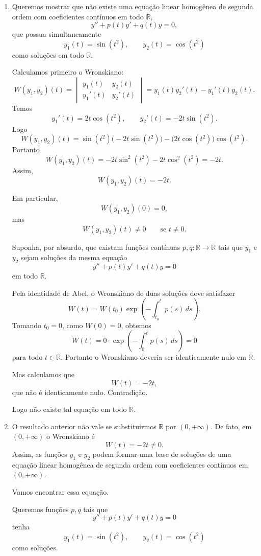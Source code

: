 \documentclass[a4paper,11pt,reqno]{amsart}
\begin{document}
\begin{enumerate}
\begin{enumerate}

\item Queremos mostrar que não existe uma equação linear homogênea de segunda ordem com coeficientes contínuos em todo $\mathbb{R}$,
\[
    y''+p(t)y'+q(t)y=0,
\]
que possua simultaneamente
\[
    y_1(t)=\sin(t^2),
    \qquad
    y_2(t)=\cos(t^2)
\]
como soluções em todo $\mathbb{R}$.

Calculamos primeiro o Wronskiano:
\[
    W(y_1,y_2)(t)
    =
    \begin{vmatrix}
        y_1(t) & y_2(t)\\
        y_1'(t) & y_2'(t)
    \end{vmatrix}
    =
    y_1(t)y_2'(t)-y_1'(t)y_2(t).
\]
Temos
\[
    y_1'(t)=2t\cos(t^2),
    \qquad
    y_2'(t)=-2t\sin(t^2).
\]
Logo
\[
    W(y_1,y_2)(t)
    =
    \sin(t^2)\bigl(-2t\sin(t^2)\bigr)
    -
    \bigl(2t\cos(t^2)\bigr)\cos(t^2).
\]
Portanto
\[
    W(y_1,y_2)(t)
    =
    -2t\sin^2(t^2)-2t\cos^2(t^2)
    =
    -2t.
\]
Assim,
\[
    \boxed{W(y_1,y_2)(t)=-2t.}
\]

Em particular,
\[
    W(y_1,y_2)(0)=0,
\]
mas
\[
    W(y_1,y_2)(t)\neq 0
    \qquad\text{se }t\neq 0.
\]

Suponha, por absurdo, que existam funções contínuas $p,q:\mathbb{R}\to\mathbb{R}$ tais que $y_1$ e $y_2$ sejam soluções da mesma equação
\[
    y''+p(t)y'+q(t)y=0
\]
em todo $\mathbb{R}$.

Pela identidade de Abel, o Wronskiano de duas soluções deve satisfazer
\[
    W(t)=W(t_0)\exp\left(-\int_{t_0}^{t}p(s)\,ds\right).
\]
Tomando $t_0=0$, como $W(0)=0$, obtemos
\[
    W(t)=0\cdot\exp\left(-\int_0^{t}p(s)\,ds\right)=0
\]
para todo $t\in\mathbb{R}$. Portanto o Wronskiano deveria ser identicamente nulo em $\mathbb{R}$.

Mas calculamos que
\[
    W(t)=-2t,
\]
que não é identicamente nulo. Contradição.

Logo não existe tal equação em todo $\mathbb{R}$.

\item O resultado anterior não vale se substituirmos $\mathbb{R}$ por $(0,+\infty)$. De fato, em $(0,+\infty)$ o Wronskiano é
\[
    W(t)=-2t\neq 0.
\]
Assim, as funções $y_1$ e $y_2$ podem formar uma base de soluções de uma equação linear homogênea de segunda ordem com coeficientes contínuos em $(0,+\infty)$.

Vamos encontrar essa equação.

Queremos funções $p,q$ tais que
\[
    y''+p(t)y'+q(t)y=0
\]
tenha
\[
    y_1(t)=\sin(t^2),
    \qquad
    y_2(t)=\cos(t^2)
\]
como soluções.


\end{enumerate}
\end{enumerate}
\end{document}
